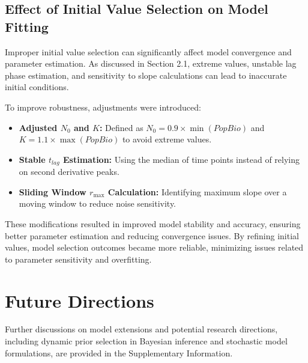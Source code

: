 \documentclass{article}
\begin{document}
\subsection{Effect of Initial Value Selection on Model Fitting}
Improper initial value selection can significantly affect model convergence and parameter estimation. As discussed in Section 2.1, extreme values, unstable lag phase estimation, and sensitivity to slope calculations can lead to inaccurate initial conditions.

To improve robustness, adjustments were introduced:
\begin{itemize}
    \item \textbf{Adjusted $N_0$ and $K$:} Defined as $N_0 = 0.9 \times \min(PopBio)$ and $K = 1.1 \times \max(PopBio)$ to avoid extreme values.
    \item \textbf{Stable $t_{lag}$ Estimation:} Using the median of time points instead of relying on second derivative peaks.
    \item \textbf{Sliding Window $r_{\max}$ Calculation:} Identifying maximum slope over a moving window to reduce noise sensitivity.
\end{itemize}

These modifications resulted in improved model stability and accuracy, ensuring better parameter estimation and reducing convergence issues. By refining initial values, model selection outcomes became more reliable, minimizing issues related to parameter sensitivity and overfitting.
\section{Future Directions}
Further discussions on model extensions and potential research directions, including dynamic prior selection in Bayesian inference and stochastic model formulations, are provided in the Supplementary Information.

  
\nocite{*}
\end{document}
